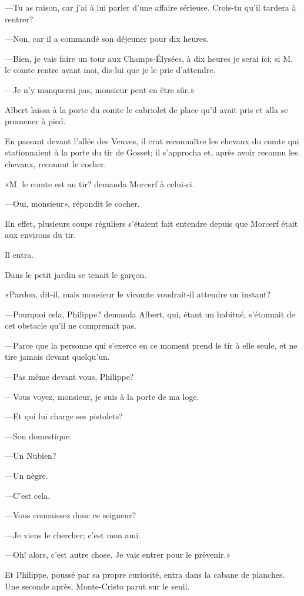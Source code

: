 —Tu as raison, car j'ai à lui parler d'une affaire sérieuse. Crois-tu qu'il tardera à rentrer? 

—Non, car il a commandé son déjeuner pour dix heures. 

—Bien, je vais faire un tour aux Champs-Élysées, à dix heures je serai ici; si M. le comte rentre avant moi, dis-lui que je le prie d'attendre. 

—Je n'y manquerai pas, monsieur peut en être sûr.» 

Albert laissa à la porte du comte le cabriolet de place qu'il avait pris et alla se promener à pied. 

En passant devant l'allée des Veuves, il crut reconnaître les chevaux du comte qui stationnaient à la porte du tir de Gosset; il s'approcha et, après avoir reconnu les chevaux, reconnut le cocher. 

«M. le comte est au tir? demanda Morcerf à celui-ci. 

—Oui, monsieur», répondit le cocher. 

En effet, plusieurs coups réguliers s'étaient fait entendre depuis que Morcerf était aux environs du tir. 

Il entra. 

Dans le petit jardin se tenait le garçon. 

«Pardon, dit-il, mais monsieur le vicomte voudrait-il attendre un instant? 

—Pourquoi cela, Philippe? demanda Albert, qui, étant un habitué, s'étonnait de cet obstacle qu'il ne comprenait pas. 

—Parce que la personne qui s'exerce en ce moment prend le tir à elle seule, et ne tire jamais devant quelqu'un. 

—Pas même devant vous, Philippe? 

—Vous voyez, monsieur, je suis à la porte de ma loge. 

—Et qui lui charge ses pistolets? 

—Son domestique. 

—Un Nubien? 

—Un nègre. 

—C'est cela. 

—Vous connaissez donc ce seigneur? 

—Je viens le chercher; c'est mon ami. 

—Oh! alors, c'est autre chose. Je vais entrer pour le prévenir.» 

Et Philippe, poussé par sa propre curiosité, entra dans la cabane de planches. Une seconde après, Monte-Cristo parut sur le seuil. 

